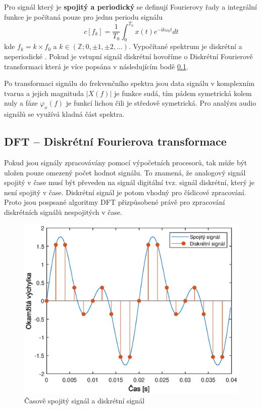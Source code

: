   Pro signál který je \textbf{spojitý a periodický} se definují Fourierovy řady a integrální funkce je počítaná pouze pro jednu periodu signálu
  \begin{equation}
    c[f_k] = \frac{1}{T_0} \int_{0}^{T_0} x(t) e^{-\mathrm{i} k \omega_0 t} dt
  \end{equation}
  kde $f_k = k \times f_0$ a $k \in (\mathbb{Z}; 0, \pm 1, \pm 2, \dots)$. Vypočítané spektrum je diskrétní a neperiodické \cite{sneddon1995fourier}. Pokud je vstupní signál diskrétní hovoříme o Diskrétní Fourierově transformaci která je více popsána v následujícím bodě \ref{sec:DFT}.

 Po transformaci signálu do frekvenčního spektra jsou data signálu v komplexním tvarua a jejich magnituda $|X(f)|$ je funkce sudá, tím pádem symetrická kolem nuly a fáze $\varphi_x(f)$ je funkcí lichou čili je středově symetrická. Pro analýzu audio signálů se využívá kladná část spektra.

  \subsection{DFT -- Diskrétní Fourierova transformace} \label{sec:DFT}

  Pokud jsou signály zpracovávány pomocí výpočetních procesorů,
  tak může být uložen pouze omezený počet hodnot signálu.
  To znamená, že analogový signál spojitý v čase musí být převeden na signál digitální tvz. signál diskrétní, který je není spojitý v čase. 
  Diskrétní signál je potom vhodný pro číslicové zpracování.
  Proto jsou pospsané algoritmy \acs{DFT} přizpůsobené právě pro zpracování diskrétních signálů nespojitých v čase.

  \begin{figure}[H]
    \centering
    \includegraphics[width = 0.8\linewidth]{obrazky/Discrete_signal.eps}
    \caption{Časově spojitý signál a diskrétní signál}
    \label{fig:Discrete_signal}
  \end{figure}

